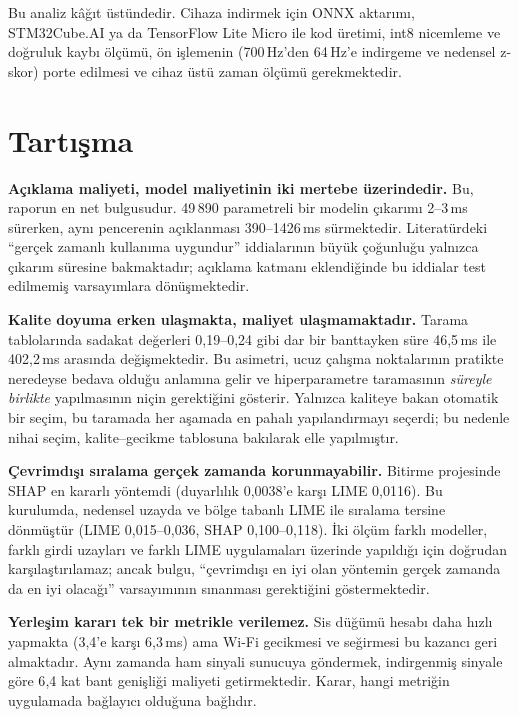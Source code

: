 \documentclass[conference]{IEEEtran}
\newcommand{\ms}{\,ms\xspace}
\begin{document}
Bu analiz kâğıt üstündedir. Cihaza indirmek için ONNX aktarımı, STM32Cube.AI ya
da TensorFlow Lite Micro ile kod üretimi, int8 nicemleme ve doğruluk kaybı
ölçümü, ön işlemenin (700\,Hz'den 64\,Hz'e indirgeme ve nedensel z-skor) porte
edilmesi ve cihaz üstü zaman ölçümü gerekmektedir.

\section{Tartışma}

\textbf{Açıklama maliyeti, model maliyetinin iki mertebe üzerindedir.} Bu,
raporun en net bulgusudur. 49\,890 parametreli bir modelin çıkarımı 2--3\ms
sürerken, aynı pencerenin açıklanması 390--1426\ms sürmektedir. Literatürdeki
``gerçek zamanlı kullanıma uygundur'' iddialarının büyük çoğunluğu yalnızca
çıkarım süresine bakmaktadır; açıklama katmanı eklendiğinde bu iddialar test
edilmemiş varsayımlara dönüşmektedir.

\textbf{Kalite doyuma erken ulaşmakta, maliyet ulaşmamaktadır.} Tarama
tablolarında sadakat değerleri 0{,}19--0{,}24 gibi dar bir banttayken süre
46{,}5\ms ile 402{,}2\ms arasında değişmektedir. Bu asimetri, ucuz çalışma
noktalarının pratikte neredeyse bedava olduğu anlamına gelir ve hiperparametre
taramasının \emph{süreyle birlikte} yapılmasının niçin gerektiğini gösterir.
Yalnızca kaliteye bakan otomatik bir seçim, bu taramada her aşamada en pahalı
yapılandırmayı seçerdi; bu nedenle nihai seçim, kalite--gecikme tablosuna
bakılarak elle yapılmıştır.

\textbf{Çevrimdışı sıralama gerçek zamanda korunmayabilir.} Bitirme projesinde
SHAP en kararlı yöntemdi (duyarlılık 0{,}0038'e karşı LIME 0{,}0116). Bu
kurulumda, nedensel uzayda ve bölge tabanlı LIME ile sıralama tersine dönmüştür
(LIME 0{,}015--0{,}036, SHAP 0{,}100--0{,}118). İki ölçüm farklı modeller,
farklı girdi uzayları ve farklı LIME uygulamaları üzerinde yapıldığı için
doğrudan karşılaştırılamaz; ancak bulgu, ``çevrimdışı en iyi olan yöntemin
gerçek zamanda da en iyi olacağı'' varsayımının sınanması gerektiğini
göstermektedir.

\textbf{Yerleşim kararı tek bir metrikle verilemez.} Sis düğümü hesabı daha hızlı
yapmakta (3{,}4'e karşı 6{,}3\ms) ama Wi-Fi gecikmesi ve seğirmesi bu kazancı
geri almaktadır. Aynı zamanda ham sinyali sunucuya göndermek, indirgenmiş
sinyale göre 6{,}4 kat bant genişliği maliyeti getirmektedir. Karar, hangi
metriğin uygulamada bağlayıcı olduğuna bağlıdır.
\end{document}
